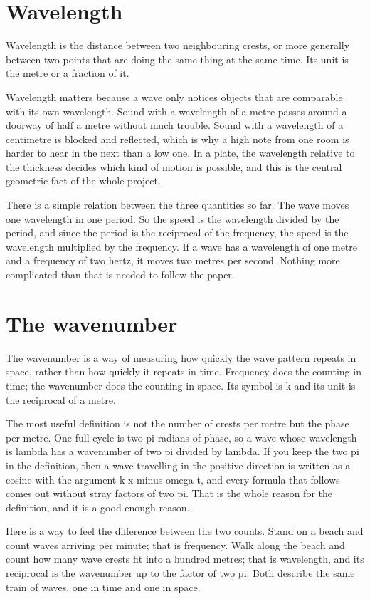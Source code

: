 \documentclass[11pt]{article}
\begin{document}
\section{Wavelength}

Wavelength is the distance between two neighbouring crests, or more generally between two points that are
doing the same thing at the same time. Its unit is the metre or a fraction of it.

Wavelength matters because a wave only notices objects that are comparable with its own wavelength. Sound
with a wavelength of a metre passes around a doorway of half a metre without much trouble. Sound with a
wavelength of a centimetre is blocked and reflected, which is why a high note from one room is harder to hear
in the next than a low one. In a plate, the wavelength relative to the thickness decides which kind of motion
is possible, and this is the central geometric fact of the whole project.

There is a simple relation between the three quantities so far. The wave moves one wavelength in one period.
So the speed is the wavelength divided by the period, and since the period is the reciprocal of the
frequency, the speed is the wavelength multiplied by the frequency. If a wave has a wavelength of one metre
and a frequency of two hertz, it moves two metres per second. Nothing more complicated than that is needed
to follow the paper.

\section{The wavenumber}

The wavenumber is a way of measuring how quickly the wave pattern repeats in space, rather than how quickly
it repeats in time. Frequency does the counting in time; the wavenumber does the counting in space. Its
symbol is k and its unit is the reciprocal of a metre.

The most useful definition is not the number of crests per metre but the phase per metre. One full cycle is
two pi radians of phase, so a wave whose wavelength is lambda has a wavenumber of two pi divided by lambda.
If you keep the two pi in the definition, then a wave travelling in the positive direction is written as a
cosine with the argument k x minus omega t, and every formula that follows comes out without stray factors
of two pi. That is the whole reason for the definition, and it is a good enough reason.

Here is a way to feel the difference between the two counts. Stand on a beach and count waves arriving per
minute; that is frequency. Walk along the beach and count how many wave crests fit into a hundred metres;
that is wavelength, and its reciprocal is the wavenumber up to the factor of two pi. Both describe the same
train of waves, one in time and one in space.
\end{document}
